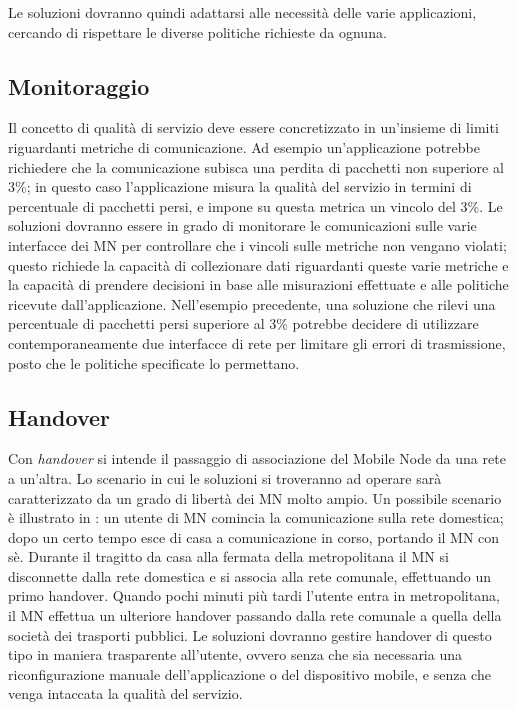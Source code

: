 \documentclass[12pt,a4paper,openright,twoside,draft]{book}
\begin{document}
Le soluzioni dovranno quindi adattarsi alle necessità delle varie
applicazioni, cercando di rispettare le diverse politiche richieste da
ognuna.

\subsection{Monitoraggio}
Il concetto di qualità di servizio deve essere concretizzato in
un'insieme di limiti riguardanti metriche di comunicazione. Ad esempio
un'applicazione potrebbe richiedere che la comunicazione subisca una
perdita di pacchetti non superiore al 3\%; in questo caso
l'applicazione misura la qualità del servizio in termini di
percentuale di pacchetti persi, e impone su questa metrica un vincolo
del 3\%. Le soluzioni dovranno essere in grado di monitorare le
comunicazioni sulle varie interfacce dei MN per controllare che i
vincoli sulle metriche non vengano violati; questo richiede la
capacità di collezionare dati riguardanti queste varie metriche e la
capacità di prendere decisioni in base alle misurazioni effettuate e
alle politiche ricevute dall'applicazione. Nell'esempio precedente,
una soluzione che rilevi una percentuale di pacchetti persi superiore
al 3\% potrebbe decidere di utilizzare contemporaneamente due
interfacce di rete per limitare gli errori di trasmissione, posto che
le politiche specificate lo permettano.

\subsection{Handover}
\label{sec:handover}
Con \emph{handover} si intende il passaggio di associazione del Mobile
Node da una rete a un'altra. Lo scenario in cui le soluzioni si
troveranno ad operare sarà caratterizzato da un grado di libertà dei
MN molto ampio. Un possibile scenario è illustrato in \cite{bib:abc}:
un utente di MN comincia la comunicazione sulla rete domestica; dopo
un certo tempo esce di casa a comunicazione in corso, portando il MN
con sè. Durante il tragitto da casa alla fermata della metropolitana
il MN si disconnette dalla rete domestica e si associa alla rete
comunale, effettuando un primo handover. Quando pochi minuti più tardi
l'utente entra in metropolitana, il MN effettua un ulteriore handover
passando dalla rete comunale a quella della società dei trasporti
pubblici. Le soluzioni dovranno gestire handover di questo tipo in
maniera trasparente all'utente, ovvero senza che sia necessaria una
riconfigurazione manuale dell'applicazione o del dispositivo mobile, e
senza che venga intaccata la qualità del servizio.
\end{document}
